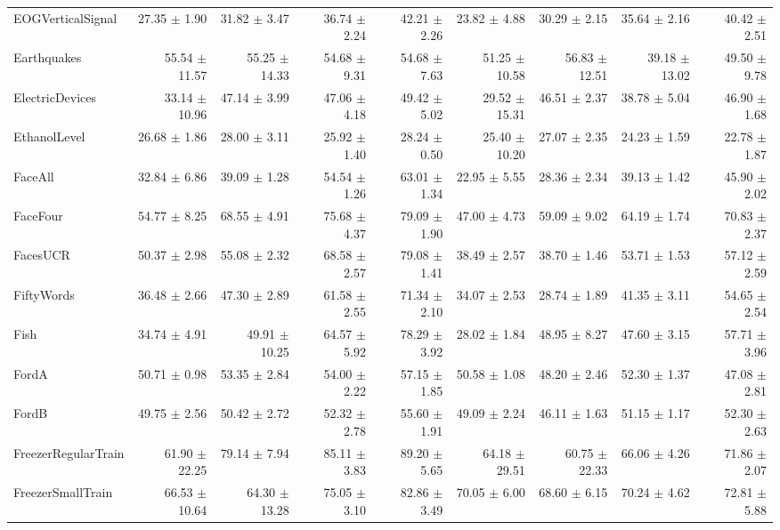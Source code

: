 \begin{landscape}
\begin{longtable}{lrrrrrrrr}
EOGVerticalSignal & 27.35 $\pm$ 1.90 & 31.82 $\pm$ 3.47 & 36.74 $\pm$ 2.24 & 42.21 $\pm$ 2.26 & 23.82 $\pm$ 4.88 & 30.29 $\pm$ 2.15 & 35.64 $\pm$ 2.16 & 40.42 $\pm$ 2.51 \\
Earthquakes & 55.54 $\pm$ 11.57 & 55.25 $\pm$ 14.33 & 54.68 $\pm$ 9.31 & 54.68 $\pm$ 7.63 & 51.25 $\pm$ 10.58 & 56.83 $\pm$ 12.51 & 39.18 $\pm$ 13.02 & 49.50 $\pm$ 9.78 \\
ElectricDevices & 33.14 $\pm$ 10.96 & 47.14 $\pm$ 3.99 & 47.06 $\pm$ 4.18 & 49.42 $\pm$ 5.02 & 29.52 $\pm$ 15.31 & 46.51 $\pm$ 2.37 & 38.78 $\pm$ 5.04 & 46.90 $\pm$ 1.68 \\
EthanolLevel & 26.68 $\pm$ 1.86 & 28.00 $\pm$ 3.11 & 25.92 $\pm$ 1.40 & 28.24 $\pm$ 0.50 & 25.40 $\pm$ 10.20 & 27.07 $\pm$ 2.35 & 24.23 $\pm$ 1.59 & 22.78 $\pm$ 1.87 \\
FaceAll & 32.84 $\pm$ 6.86 & 39.09 $\pm$ 1.28 & 54.54 $\pm$ 1.26 & 63.01 $\pm$ 1.34 & 22.95 $\pm$ 5.55 & 28.36 $\pm$ 2.34 & 39.13 $\pm$ 1.42 & 45.90 $\pm$ 2.02 \\
FaceFour & 54.77 $\pm$ 8.25 & 68.55 $\pm$ 4.91 & 75.68 $\pm$ 4.37 & 79.09 $\pm$ 1.90 & 47.00 $\pm$ 4.73 & 59.09 $\pm$ 9.02 & 64.19 $\pm$ 1.74 & 70.83 $\pm$ 2.37 \\
FacesUCR & 50.37 $\pm$ 2.98 & 55.08 $\pm$ 2.32 & 68.58 $\pm$ 2.57 & 79.08 $\pm$ 1.41 & 38.49 $\pm$ 2.57 & 38.70 $\pm$ 1.46 & 53.71 $\pm$ 1.53 & 57.12 $\pm$ 2.59 \\
FiftyWords & 36.48 $\pm$ 2.66 & 47.30 $\pm$ 2.89 & 61.58 $\pm$ 2.55 & 71.34 $\pm$ 2.10 & 34.07 $\pm$ 2.53 & 28.74 $\pm$ 1.89 & 41.35 $\pm$ 3.11 & 54.65 $\pm$ 2.54 \\
Fish & 34.74 $\pm$ 4.91 & 49.91 $\pm$ 10.25 & 64.57 $\pm$ 5.92 & 78.29 $\pm$ 3.92 & 28.02 $\pm$ 1.84 & 48.95 $\pm$ 8.27 & 47.60 $\pm$ 3.15 & 57.71 $\pm$ 3.96 \\
FordA & 50.71 $\pm$ 0.98 & 53.35 $\pm$ 2.84 & 54.00 $\pm$ 2.22 & 57.15 $\pm$ 1.85 & 50.58 $\pm$ 1.08 & 48.20 $\pm$ 2.46 & 52.30 $\pm$ 1.37 & 47.08 $\pm$ 2.81 \\
FordB & 49.75 $\pm$ 2.56 & 50.42 $\pm$ 2.72 & 52.32 $\pm$ 2.78 & 55.60 $\pm$ 1.91 & 49.09 $\pm$ 2.24 & 46.11 $\pm$ 1.63 & 51.15 $\pm$ 1.17 & 52.30 $\pm$ 2.63 \\
FreezerRegularTrain & 61.90 $\pm$ 22.25 & 79.14 $\pm$ 7.94 & 85.11 $\pm$ 3.83 & 89.20 $\pm$ 5.65 & 64.18 $\pm$ 29.51 & 60.75 $\pm$ 22.33 & 66.06 $\pm$ 4.26 & 71.86 $\pm$ 2.07 \\
FreezerSmallTrain & 66.53 $\pm$ 10.64 & 64.30 $\pm$ 13.28 & 75.05 $\pm$ 3.10 & 82.86 $\pm$ 3.49 & 70.05 $\pm$ 6.00 & 68.60 $\pm$ 6.15 & 70.24 $\pm$ 4.62 & 72.81 $\pm$ 5.88 \\

\end{longtable}
\end{landscape}
